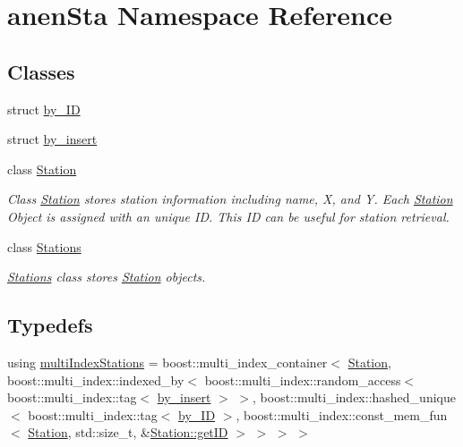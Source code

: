 \hypertarget{namespaceanen_sta}{}\section{anen\+Sta Namespace Reference}
\label{namespaceanen_sta}
\subsection*{Classes}
\begin{DoxyCompactItemize}
\item 
struct \mbox{\hyperlink{structanen_sta_1_1by___i_d}{by\+\_\+\+ID}}
\item 
struct \mbox{\hyperlink{structanen_sta_1_1by__insert}{by\+\_\+insert}}
\item 
class \mbox{\hyperlink{classanen_sta_1_1_station}{Station}}
\begin{DoxyCompactList}\small\item\em Class \mbox{\hyperlink{classanen_sta_1_1_station}{Station}} stores station information including name, X, and Y. Each \mbox{\hyperlink{classanen_sta_1_1_station}{Station}} Object is assigned with an unique ID. This ID can be useful for station retrieval. \end{DoxyCompactList}\item 
class \mbox{\hyperlink{classanen_sta_1_1_stations}{Stations}}
\begin{DoxyCompactList}\small\item\em \mbox{\hyperlink{classanen_sta_1_1_stations}{Stations}} class stores \mbox{\hyperlink{classanen_sta_1_1_station}{Station}} objects. \end{DoxyCompactList}\end{DoxyCompactItemize}
\subsection*{Typedefs}
\begin{DoxyCompactItemize}
\item 
using \mbox{\hyperlink{namespaceanen_sta_a913b335ef67a3eed40106e55b9a4582c}{multi\+Index\+Stations}} = boost\+::multi\+\_\+index\+\_\+container$<$ \mbox{\hyperlink{classanen_sta_1_1_station}{Station}}, boost\+::multi\+\_\+index\+::indexed\+\_\+by$<$ boost\+::multi\+\_\+index\+::random\+\_\+access$<$ boost\+::multi\+\_\+index\+::tag$<$ \mbox{\hyperlink{structanen_sta_1_1by__insert}{by\+\_\+insert}} $>$ $>$, boost\+::multi\+\_\+index\+::hashed\+\_\+unique$<$ boost\+::multi\+\_\+index\+::tag$<$ \mbox{\hyperlink{structanen_sta_1_1by___i_d}{by\+\_\+\+ID}} $>$, boost\+::multi\+\_\+index\+::const\+\_\+mem\+\_\+fun$<$ \mbox{\hyperlink{classanen_sta_1_1_station}{Station}}, std\+::size\+\_\+t, \&\mbox{\hyperlink{classanen_sta_1_1_station_a7da5e30ee0d25653333630aa61ca5257}{Station\+::get\+ID}} $>$ $>$ $>$ $>$
\end{DoxyCompactItemize}
